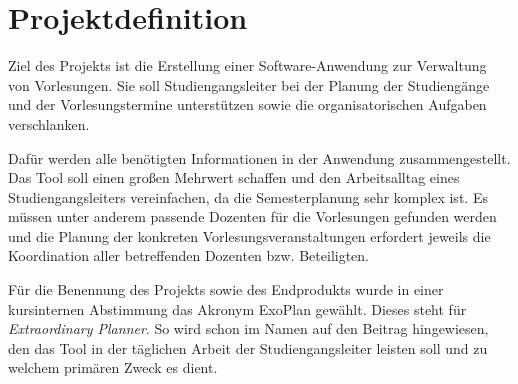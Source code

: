 \section{Projektdefinition}
Ziel des Projekts ist die Erstellung einer Software-Anwendung zur Verwaltung von Vorlesungen.
Sie soll Studiengangsleiter bei der Planung der Studiengänge und der Vorlesungstermine unterstützen sowie die organisatorischen Aufgaben verschlanken. 

Dafür werden alle benötigten Informationen in der Anwendung zusammengestellt.
Das Tool soll einen großen Mehrwert schaffen und den Arbeitsalltag eines Studiengangsleiters vereinfachen, da die Semesterplanung sehr komplex ist.
Es müssen unter anderem passende Dozenten für die Vorlesungen gefunden werden und die Planung der konkreten Vorlesungsveranstaltungen erfordert jeweils die Koordination aller betreffenden Dozenten bzw. Beteiligten.

Für die Benennung des Projekts sowie des Endprodukts wurde in einer kursinternen Abstimmung das Akronym ExoPlan gewählt.
Dieses steht für \textit{Extraordinary Planner}.
So wird schon im Namen auf den Beitrag hingewiesen, den das Tool in der täglichen Arbeit der Studiengangsleiter leisten soll und zu welchem primären Zweck es dient.
